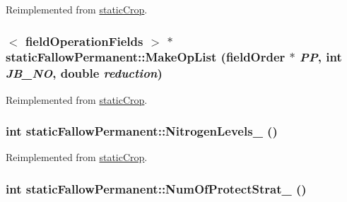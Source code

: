 Reimplemented from \hyperlink{classstatic_crop_ac8b14325e2ab05247e9b61e3af331f24}{staticCrop}.\hypertarget{classstatic_fallow_permanent_a29f8a19c2c136b8b2c0d4d0cca1f0522}{
\subsubsection[{MakeOpList}]{$<$ {\bf fieldOperationFields} $>$ $\ast$ staticFallowPermanent::MakeOpList ({\bf fieldOrder} $\ast$ {\em PP}, \/  int {\em JB\_\-NO}, \/  double {\em reduction})}}
\label{classstatic_fallow_permanent_a29f8a19c2c136b8b2c0d4d0cca1f0522}


Reimplemented from \hyperlink{classstatic_crop_a9b67ef1ae531a3afb32b63a4aeb5916b}{staticCrop}.\hypertarget{classstatic_fallow_permanent_a41d25045659c5c692f9e7da40ba1cea6}{
\subsubsection[{NitrogenLevels\_\-}]{\setlength{\rightskip}{0pt plus 5cm}int staticFallowPermanent::NitrogenLevels\_\- ()}}
\label{classstatic_fallow_permanent_a41d25045659c5c692f9e7da40ba1cea6}


Reimplemented from \hyperlink{classstatic_crop_a32b69ed138beaed150efa74d18e82d8e}{staticCrop}.\hypertarget{classstatic_fallow_permanent_ae8cd1ab1cae0d7aef49a95ce57e4c7bc}{
\subsubsection[{NumOfProtectStrat\_\-}]{\setlength{\rightskip}{0pt plus 5cm}int staticFallowPermanent::NumOfProtectStrat\_\- ()}}
\label{classstatic_fallow_permanent_ae8cd1ab1cae0d7aef49a95ce57e4c7bc}


